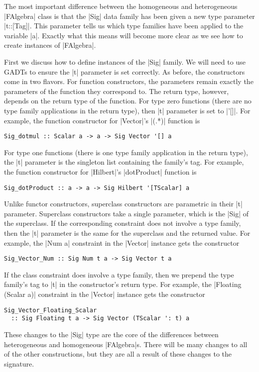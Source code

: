 \documentclass[preprint]{sigplanconf}
\theoremstyle{definition}
\begin{document}
The most important difference between the homogeneous and heterogeneous |FAlgebra| class is that the |Sig| data family has been given a new type parameter |t::[Tag]|.
This parameter tells us which type families have been applied to the variable |a|.
Exactly what this means will become more clear as we see how to create instances of |FAlgebra|.

First we discuss how to define instances of the |Sig| family.
We will need to use GADTs \cite{schrijvers2009complete} to ensure the |t| parameter is set correctly.
As before, the constructors come in two flavors.
For function constructors,
the parameters remain exactly the parameters of the function they correspond to.
The return type, however, depends on the return type of the function.
For type zero functions (there are no type family applications in the return type),
then |t| parameter is set to |'[]|.
For example, the function constructor for |Vector|'s |(.*)| function is
\begin{lstlisting}
Sig_dotmul :: Scalar a -> a -> Sig Vector '[] a
\end{lstlisting}
For type one functions (there is one type family application in the return type),
the |t| parameter is the singleton list containing the family's tag.
For example, the function constructor for |Hilbert|'s |dotProduct| function is
\begin{lstlisting}
Sig_dotProduct :: a -> a -> Sig Hilbert '[TScalar] a
\end{lstlisting}
Unlike functor constructors, superclass constructors are parametric in their |t| parameter.
Superclass constructors take a single parameter,
which is the |Sig| of the superclass.
If the corresponding constraint does not involve a type family,
then the |t| parameter is the same for the superclass and the returned value.
For example, the |Num a| constraint in the |Vector| instance gets the constructor
\begin{lstlisting}
Sig_Vector_Num :: Sig Num t a -> Sig Vector t a
\end{lstlisting}
If the class constraint does involve a type family,
then we prepend the type family's tag to |t| in the constructor's return type.
For example, the |Floating (Scalar a)| constraint in the |Vector| instance gets the constructor
\begin{lstlisting}
Sig_Vector_Floating_Scalar
  :: Sig Floating t a -> Sig Vector (TScalar ': t) a
\end{lstlisting}
These changes to the |Sig| type are the core of the differences between heterogeneous and homogeneous |FAlgebra|s.
There will be many changes to all of the other constructions,
but they are all a result of these changes to the signature.
\end{document}
